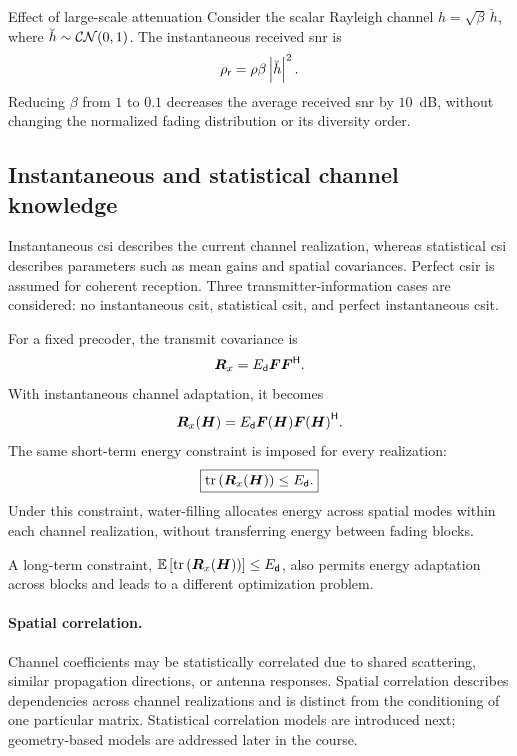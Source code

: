 \begin{example}{Effect of large-scale attenuation}
	Consider the scalar Rayleigh channel
	$h=\sqrt{\beta}\,\breve{h}$, where
	$\breve{h}\sim\mathcal{CN}(0,1)$.
	The instantaneous received \ac{snr} is
	\begin{equation*}
		\rho_{\mathsf r}
		=\rho\beta\left|\breve{h}\right|^2.
	\end{equation*}
	Reducing $\beta$ from $1$ to $0.1$ decreases
	the average received \ac{snr} by $10$~dB,
	without changing the normalized fading distribution
	or its diversity order.
\end{example}

\subsection{Instantaneous and statistical channel knowledge}

Instantaneous \ac{csi} describes the current channel
realization, whereas statistical \ac{csi} describes
parameters such as mean gains and spatial covariances.
Perfect \ac{csir} is assumed for coherent reception.
Three transmitter-information cases are considered:
no instantaneous \ac{csit}, statistical \ac{csit},
and perfect instantaneous \ac{csit}.

For a fixed precoder, the transmit covariance is
\begin{equation*}
	\bm{R}_x=E_{\mathsf{d}}\bm{F}{\bm{F}}^{\mathsf{H}}.
\end{equation*}
With instantaneous channel adaptation, it becomes
\begin{equation*}
	\bm{R}_x(\bm{H})
	=E_{\mathsf{d}}\bm{F}(\bm{H}){\bm{F}(\bm{H})}^{\mathsf{H}}.
\end{equation*}
The same short-term energy constraint is imposed
for every realization:
\begin{equation}\label{eq:shortpower}
	\boxed{
		\operatorname{tr}\left(\bm{R}_x(\bm{H})\right)\leq E_{\mathsf{d}}.
	}
\end{equation}
Under this constraint, water-filling allocates energy
across spatial modes within each channel realization,
without transferring energy between fading blocks.

A long-term constraint,
$\mathbb{E}\left[\operatorname{tr}\left(\bm{R}_x(\bm{H})\right)\right]\leq E_{\mathsf{d}}$,
also permits energy adaptation across blocks and
leads to a different optimization problem.

\paragraph{Spatial correlation.}
Channel coefficients may be statistically correlated
due to shared scattering, similar propagation directions,
or antenna responses.
Spatial correlation describes dependencies across
channel realizations and is distinct from the
conditioning of one particular matrix.
Statistical correlation models are introduced next;
geometry-based models are addressed later in the course.



